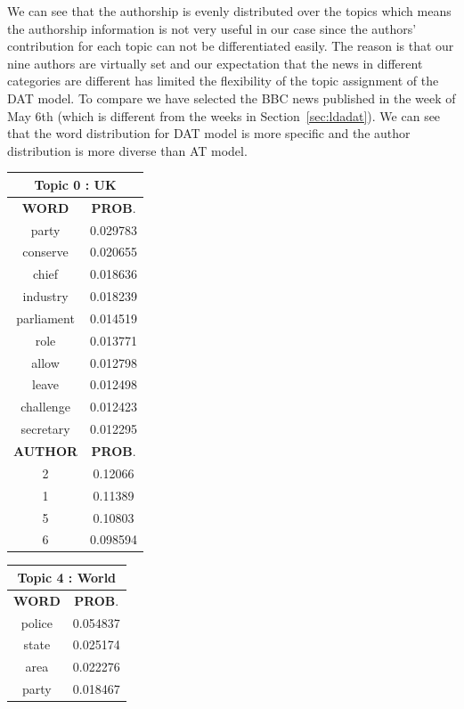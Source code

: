 We can see that the authorship is evenly distributed over the topics which means the authorship information is not very useful in our case since the authors' contribution for each topic can not be differentiated easily. The reason is that our nine authors are virtually set and our expectation that the news in different categories are different has limited the flexibility of the topic assignment of the DAT model. To compare we have selected the BBC news published in the week of May 6th (which is different from the weeks in Section~\ref{sec:ldadat}). We can see that the word distribution for DAT model is more specific and the author distribution is more diverse than AT model.  


\begin{table}[h!]
\centering
\begin{tabular}{|c c|} 
\hline
\multicolumn{2}{|c|}{\textbf{Topic 0 : UK}} \\
\hline
 \textbf{WORD} & \textbf{PROB}.  \\ [0.3ex] 
 \hline
 	party &  0.029783\\
	conserve  &   0.020655\\
	chief  &   0.018636\\
	industry  &   0.018239\\
	parliament  &   0.014519\\
	role  &   0.013771\\
	allow  &   0.012798\\
	leave  &   0.012498\\
	challenge   &  0.012423\\
	secretary   &  0.012295\\[1ex] 
 \hline
  \textbf{AUTHOR} & \textbf{PROB}.  \\ [0.3ex] 
 \hline
 2 &  0.12066\\
1  & 0.11389\\
5  & 0.10803\\
6  & 0.098594\\
 \hline
\end{tabular}
 \hfill
\begin{tabular}{|c c|} 
\hline
\multicolumn{2}{|c|}{\textbf{Topic 4 : World}} \\
\hline
 \textbf{WORD} & \textbf{PROB}.  \\ [0.3ex] 
 \hline
 	police &  0.054837\\
	state &   0.025174\\
	area &   0.022276\\
	party &   0.018467\\

\end{tabular}
\end{table}
